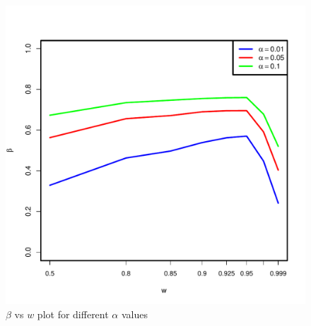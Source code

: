 \documentclass[11pt]{article} %
\begin{document}
\begin{figure}[h]
      \centering
         \includegraphics[scale=0.35]{OOSMVN-power-w-c0.pdf}
\caption{$\beta$ vs $w$ plot for different $\alpha$ values }
\label{fig:MVN-c0-power-w}
      

  \end{figure}
\end{document}
